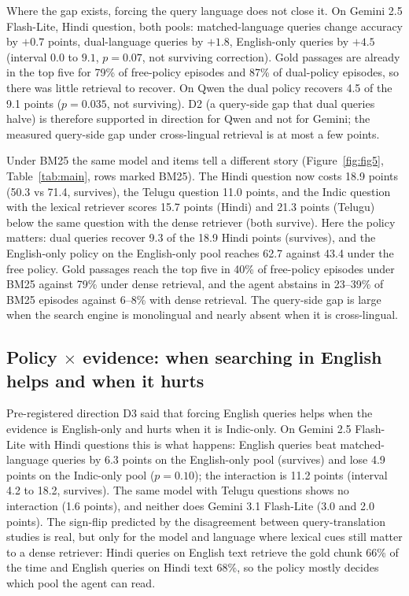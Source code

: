 Where the gap exists, forcing the query language does not close it. On Gemini 2.5 Flash-Lite, Hindi question, both pools: matched-language queries change accuracy by $+0.7$ points, dual-language queries by $+1.8$, English-only queries by $+4.5$ (interval $0.0$ to $9.1$, $p=0.07$, not surviving correction). Gold passages are already in the top five for 79\% of free-policy episodes and 87\% of dual-policy episodes, so there was little retrieval to recover. On Qwen the dual policy recovers 4.5 of the 9.1 points ($p=0.035$, not surviving). D2 (a query-side gap that dual queries halve) is therefore supported in direction for Qwen and not for Gemini; the measured query-side gap under cross-lingual retrieval is at most a few points.

Under BM25 the same model and items tell a different story (Figure~\ref{fig:fig5}, Table~\ref{tab:main}, rows marked BM25). The Hindi question now costs 18.9 points (50.3 vs 71.4, survives), the Telugu question 11.0 points, and the Indic question with the lexical retriever scores 15.7 points (Hindi) and 21.3 points (Telugu) below the same question with the dense retriever (both survive). Here the policy matters: dual queries recover 9.3 of the 18.9 Hindi points (survives), and the English-only policy on the English-only pool reaches 62.7 against 43.4 under the free policy. Gold passages reach the top five in 40\% of free-policy episodes under BM25 against 79\% under dense retrieval, and the agent abstains in 23--39\% of BM25 episodes against 6--8\% with dense retrieval. The query-side gap is large when the search engine is monolingual and nearly absent when it is cross-lingual.

\subsection{Policy \texorpdfstring{$\times$}{x} evidence: when searching in English helps and when it hurts}
\label{sec:results-interaction}

Pre-registered direction D3 said that forcing English queries helps when the evidence is English-only and hurts when it is Indic-only. On Gemini 2.5 Flash-Lite with Hindi questions this is what happens: English queries beat matched-language queries by 6.3 points on the English-only pool (survives) and lose 4.9 points on the Indic-only pool ($p=0.10$); the interaction is 11.2 points (interval 4.2 to 18.2, survives). The same model with Telugu questions shows no interaction (1.6 points), and neither does Gemini 3.1 Flash-Lite (3.0 and 2.0 points). The sign-flip predicted by the disagreement between query-translation studies \citep{a2507_07543,a2504_03616} is real, but only for the model and language where lexical cues still matter to a dense retriever: Hindi queries on English text retrieve the gold chunk 66\% of the time and English queries on Hindi text 68\%, so the policy mostly decides which pool the agent can read.

